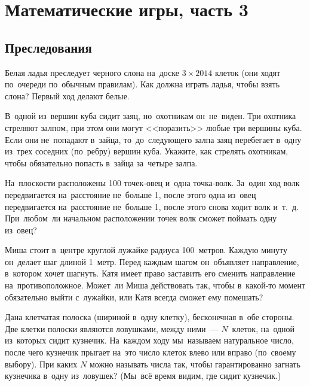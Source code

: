 

\section*{Математические игры, часть 3}



\subsection*{Преследования}

\begin{problems}

\item
Белая ладья преследует черного слона на~доске $3 \times 2014$ клеток
(они ходят по~очереди по~обычным правилам).
Как должна играть ладья, чтобы взять слона?
Первый ход делают белые.

\item
В~одной из~вершин куба сидит заяц, но~охотникам он~не~виден.
Три охотника стреляют залпом, при этом они могут <<поразить>> любые три вершины
куба.
Если они не~попадают в~зайца, то~до~следующего залпа заяц перебегает в~одну
из~трех соседних (по~ребру) вершин куба.
Укажите, как стрелять охотникам, чтобы обязательно попасть в~зайца за~четыре
залпа.

\item
На~плоскости расположены 100 точек-овец и~одна точка-волк.
За~один ход волк передвигается на~расстояние не~больше 1, после этого одна
из~овец передвигается на~расстояние не~больше 1, после этого снова ходит волк
и~т.~д.
При~любом~ли начальном расположении точек волк сможет поймать одну из~овец?

\item
Миша стоит в~центре круглой лужайке радиуса 100~метров.
Каждую минуту он~делает шаг длиной 1~метр.
Перед каждым шагом он~объявляет направление, в~котором хочет шагнуть.
Катя имеет право заставить его сменить направление на~противоположное.
Может~ли Миша действовать так, чтобы в~какой-то момент обязательно выйти
с~лужайки, или Катя всегда сможет ему помешать?

\item
Дана клетчатая полоска (шириной в~одну клетку), бесконечная в~обе стороны.
Две клетки полоски являются ловушками, между ними~--- $N$~клеток, на~одной
из~которых сидит кузнечик.
На~каждом ходу мы~называем натуральное число, после чего кузнечик прыгает
на~это число клеток влево или вправо (по~своему выбору).
При каких $N$ можно называть числа так, чтобы гарантированно загнать кузнечика
в~одну из~ловушек?
(Мы~всё время видим, где сидит кузнечик.)


\end{problems}
